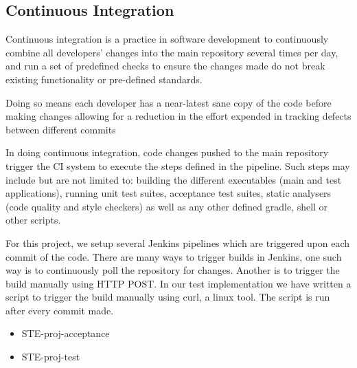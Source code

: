 \subsection{Continuous Integration}
Continuous integration is a practice in software development to continuously combine all developers’ changes into the main repository several times per day, and run a set of predefined checks to ensure the changes made do not break existing functionality or pre-defined standards. 
\par
Doing so means each developer has a near-latest sane copy of the code before making changes allowing for a reduction in the effort expended in tracking defects between different commits  
\par
In doing continuous integration, code changes pushed to the main repository  trigger the CI system to execute the steps defined in the pipeline.
Such steps may include but are not limited to: building the different executables (main and test applications), running unit test suites, acceptance test suites, static analysers (code quality and style checkers) as well as any other defined gradle, shell or other scripts.  
\par
For this project, we setup several Jenkins pipelines which are triggered upon each commit of the code. There are many ways to trigger builds in Jenkins, one such way is to continuously poll the repository for changes. 
Another is to trigger the build manually using HTTP POST. In our test implementation we have written a script to trigger the build manually using curl, a linux tool. The script is run after every commit made. 
\begin{itemize}
	\item STE-proj-acceptance
	\item STE-proj-test
\end{itemize}
